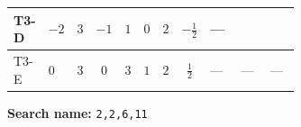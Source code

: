 \documentclass[8pt]{article}
\begin{document}
\begin{landscape}
\begin{longtable}{@{}llcccccc >{\raggedright\arraybackslash}p{0.21\linewidth} >{\raggedright\arraybackslash}p{0.21\linewidth} >{\raggedright\arraybackslash}p{0.21\linewidth}@{}}
\midrule
T3-D & $-2$ & $3$ & $-1$ & $1$ & $0$ & $2$ & $-\frac{1}{2}$ & --- & \scriptsize\adjustbox{max width=\linewidth}{$\begin{gathered} - \frac{11 \cdot 3^{\frac{3}{4}} i g_{2}^{2} \overline{y_{1}} \overline{y_{2}}}{8 MF}\end{gathered}$} & \scriptsize\adjustbox{max width=\linewidth}{$\begin{gathered} - \frac{3^{\frac{3}{4}} i lambda12Inv1 \overline{y_{1}} \overline{y_{2}}}{6 MF}\end{gathered}$} \\
\midrule
T3-E & $0$ & $3$ & $0$ & $3$ & $1$ & $2$ & $\frac{1}{2}$ & --- & --- & --- \\
\midrule
\bottomrule
\end{longtable}
\clearpage
\noindent\textbf{Search name: }\texttt{2,2,6,11}\par\smallskip

\end{landscape}
\end{document}
